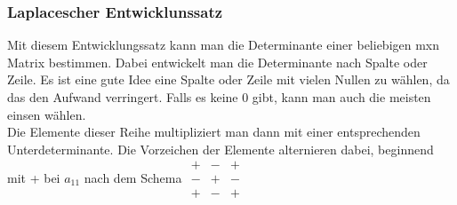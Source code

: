 \documentclass{article}
\begin{document}
	\subsubsection{Laplacescher Entwicklunssatz}
	Mit diesem Entwicklungssatz kann man die Determinante einer beliebigen mxn Matrix bestimmen. Dabei entwickelt man die Determinante nach Spalte oder Zeile. Es ist eine gute Idee eine Spalte oder Zeile mit vielen Nullen zu wählen, da das den Aufwand verringert. Falls es keine 0 gibt, kann man auch die meisten einsen wählen. \\
	Die Elemente dieser Reihe multipliziert man dann mit einer entsprechenden Unterdeterminante. Die Vorzeichen der Elemente alternieren dabei, beginnend mit + bei $a_{11}$ nach dem Schema $\begin{matrix} + & - & + \\ - & + & - \\ + & - & + \end{matrix}$ \\
\end{document}
